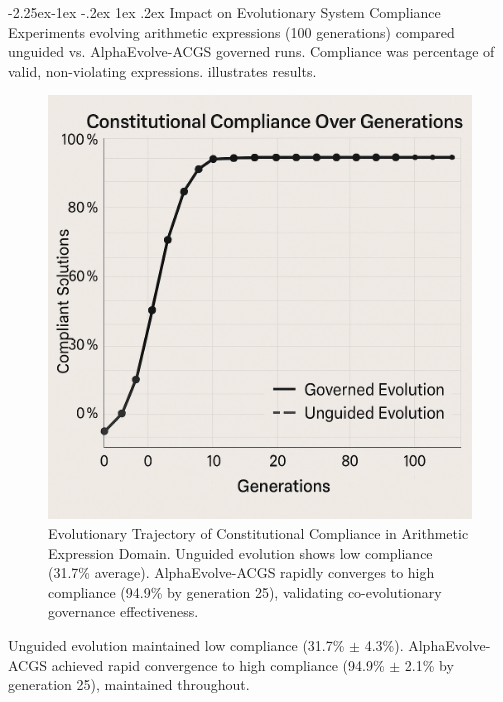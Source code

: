 \documentclass[manuscript,screen,review,anonymous,9pt]{acmart}
\makeatletter
\renewcommand\subsection{\@startsection{subsection}{2}{\z@}%
  {-2.25ex\@plus -1ex \@minus -.2ex}%
  {1ex \@plus .2ex}%
  {\normalfont\large\bfseries}}
\makeatother
\begin{document}
\subsection{Impact on Evolutionary System Compliance}
\label{subsec:impact_compliance}
Experiments evolving arithmetic expressions (100 generations) compared unguided vs. AlphaEvolve-ACGS governed runs. Compliance was percentage of valid, non-violating expressions.  illustrates results.
\begin{figure}[htbp]
\centering
\includegraphics[width=\linewidth,keepaspectratio]{figs/Figure_4_Constitutional_Compliance_Over_Generations.png}
\caption[Evolutionary Trajectory of Constitutional Compliance]{Evolutionary Trajectory of Constitutional Compliance in Arithmetic Expression Domain. Unguided evolution shows low compliance (31.7\% average). AlphaEvolve-ACGS rapidly converges to high compliance (94.9\% by generation 25), validating co-evolutionary governance effectiveness.}
\label{fig:compliance_over_generations}
\end{figure}
Unguided evolution maintained low compliance (31.7\% $\pm$ 4.3\%). AlphaEvolve-ACGS achieved rapid convergence to high compliance (94.9\% $\pm$ 2.1\% by generation 25), maintained throughout.
\end{document}
